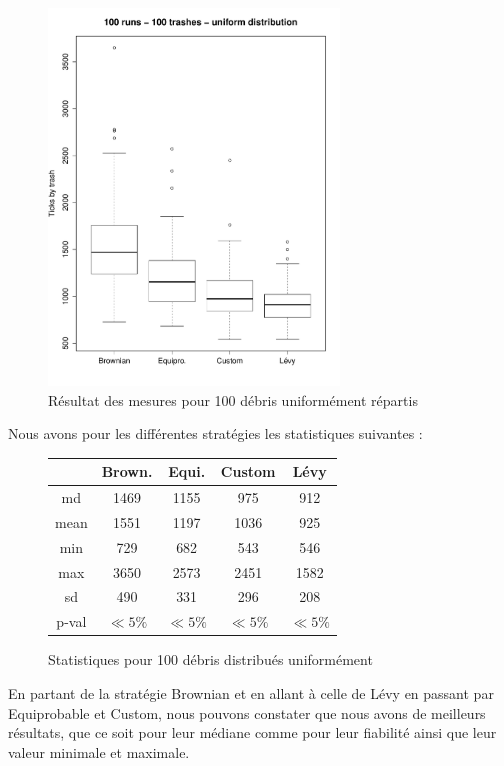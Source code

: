 
\begin{figure}[H]
	\begin{center}
		\includegraphics[height=10cm]{diagrams/100TrRnd_all.pdf}
		\caption{Résultat des mesures pour 100 débris uniformément répartis}
		\label{fig:100Trashes_Rnd}
	\end{center}
\end{figure}

Nous avons pour les différentes stratégies les statistiques suivantes :

\begin{figure}[H]
	\begin{center}
		\begin{tabular}{| c || c | c | c | c | }
			\hline
			&Brown.&Equi.&Custom&Lévy \\
			\hline
			\hline
			md&1469&1155&975&912\\
			mean&1551&1197&1036&925\\
			min & 729 & 682 & 543 & 546 \\
			max & 3650 & 2573 & 2451 & 1582 \\
			sd&490&331&296&208\\
			p-val&$\ll 5\%$&$\ll 5\%$&$\ll 5\%$&$\ll 5\%$\\
			\hline
		\end{tabular}
		\caption{Statistiques pour 100 débris distribués uniformément}
	\end{center}
\end{figure}

En partant de la stratégie Brownian et en allant à celle de Lévy
en passant par Equiprobable et Custom, nous pouvons constater
que nous avons de meilleurs résultats, que ce soit pour leur médiane
comme pour leur fiabilité ainsi que leur valeur minimale et maximale.

